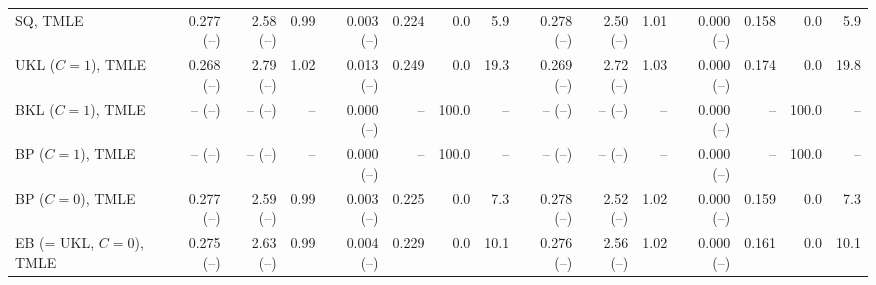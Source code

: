 \begin{tabular}{lrrrrrrrrrrrrrr}
SQ, TMLE & 0.277 (--) & 2.58 (--) & 0.99 & 0.003 (--) & 0.224 & 0.0 & 5.9 & 0.278 (--) & 2.50 (--) & 1.01 & 0.000 (--) & 0.158 & 0.0 & 5.9 \\
UKL ($C=1$), TMLE & 0.268 (--) & 2.79 (--) & 1.02 & 0.013 (--) & 0.249 & 0.0 & 19.3 & 0.269 (--) & 2.72 (--) & 1.03 & 0.000 (--) & 0.174 & 0.0 & 19.8 \\
BKL ($C=1$), TMLE & -- (--) & -- (--) & -- & 0.000 (--) & -- & 100.0 & -- & -- (--) & -- (--) & -- & 0.000 (--) & -- & 100.0 & -- \\
BP ($C=1$), TMLE & -- (--) & -- (--) & -- & 0.000 (--) & -- & 100.0 & -- & -- (--) & -- (--) & -- & 0.000 (--) & -- & 100.0 & -- \\
BP ($C=0$), TMLE & 0.277 (--) & 2.59 (--) & 0.99 & 0.003 (--) & 0.225 & 0.0 & 7.3 & 0.278 (--) & 2.52 (--) & 1.02 & 0.000 (--) & 0.159 & 0.0 & 7.3 \\
EB (= UKL, $C=0$), TMLE & 0.275 (--) & 2.63 (--) & 0.99 & 0.004 (--) & 0.229 & 0.0 & 10.1 & 0.276 (--) & 2.56 (--) & 1.02 & 0.000 (--) & 0.161 & 0.0 & 10.1 \\
\hline
\end{tabular}
